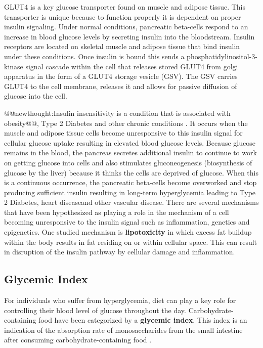 \documentclass{tufte-handout}
\makeatletter
\def\newthought#1{@@newthought:#1@@}
\makeatother
\begin{document}
GLUT4 is a key glucose transporter found on muscle and adipose tissue. This transporter is unique because to function properly it is dependent on proper insulin signaling. Under normal conditions, pancreatic beta-cells respond to an increase in blood glucose levels by secreting insulin into the bloodstream. Insulin receptors are located on skeletal muscle and adipose tissue that bind insulin under these conditions. Once insulin is bound this sends a phosphatidylinositol-3-kinase signal cascade within the cell that releases stored GLUT4 from golgi apparatus in the form of a GLUT4 storage vesicle (GSV). The GSV carries GLUT4 to the cell membrane, releases it and allows for passive diffusion of glucose into the cell.

\newthought{Insulin insensitivity is a condition that is associated with obesity}, Type 2 Diabetes and other chronic conditions \citep{DeFronzo2010}. It occurs when the muscle and adipose tissue cells become unresponsive to this insulin signal for cellular glucose uptake resulting in elevated blood glucose levels. Because glucose remains in the blood, the pancreas secretes additional insulin to continue to work on getting glucose into cells and also stimulates gluconeogenesis (biosynthesis of glucose by the liver) because it thinks the cells are deprived of glucose. When this is a continuous occurrence, the pancreatic beta-cells become overworked and stop producing sufficient insulin resulting in long-term hyperglycemia leading to Type 2 Diabetes, heart diseaseand other vascular disease. There are several mechanisms that have been hypothesized as playing a role in the mechanism of a cell becoming unresponsive to the insulin signal such as inflammation, genetics and epigenetics. One studied mechanism is \textbf{lipotoxicity} in which excess fat buildup within the body results in fat residing on or within cellular space. This can result in disruption of the insulin pathway by cellular damage and inflammation.

\subsection{Glycemic Index} For individuals who suffer from hyperglycemia, diet can play a key role for controlling their blood level of glucose throughout the day.  Carbohydrate-containing food have been categorized by a \textbf{glycemic index}. This index is an indication of the absorption rate of monosaccharides from the small intestine after consuming carbohydrate-containing food \citep{Atkinson2008,Dodd2011}.
\end{document}
